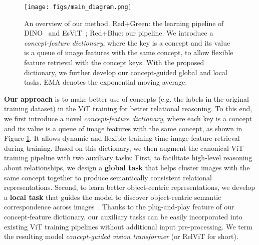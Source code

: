 \documentclass{article} \usepackage{iclr2022_conference,times}
\begin{document}
\begin{figure}[t!]
    \vskip -0.2in
    \centering
    \texttt{[image: figs/main\_diagram.png]}
    \vspace{-14pt}
    \caption{An overview of our method. \textcolor{myred}{Red}+\textcolor{mygreen}{Green}: the learning pipeline of DINO~\citep{dino} and EsViT~\citep{esvit}; \textcolor{myred}{Red}+\textcolor{myblue}{Blue}: our pipeline. We introduce a \emph{concept-feature dictionary}, where the key is a concept  and its value is a queue of image features  with the same concept, to allow flexible feature retrieval with the concept keys. With the proposed dictionary, we further develop our concept-guided global and local tasks. EMA denotes the exponential moving average.
    }
    \label{fig:main_diagram}
    \vspace{-16pt}
\end{figure}

\textbf{Our approach} is to make better use of concepts (e.g. the labels in the original training dataset) in the ViT training for better relational reasoning. To this end, we first introduce a novel \emph{concept-feature dictionary}, where each key is a concept and its value is a queue of image features with the same concept, as shown in Figure \ref{fig:main_diagram}. It allows dynamic and flexible training-time image feature retrieval during training. Based on this dictionary, we then augment the canonical ViT training pipeline with two auxiliary tasks: First, to facilitate high-level reasoning about relationships, we design a \textbf{global task} that helps cluster images with the same concept together to produce semantically consistent relational representations. Second, to learn better object-centric representations, we develop a \textbf{local task} that guides the model to discover object-centric semantic correspondence across images~\citep{liu2010sift}. Thanks to the plug-and-play feature of our concept-feature dictionary, our auxiliary tasks can be easily incorporated into existing ViT training pipelines without additional input pre-processing. We term the resulting model \emph{concept-guided vision transformer} (or RelViT for short).
\end{document}
